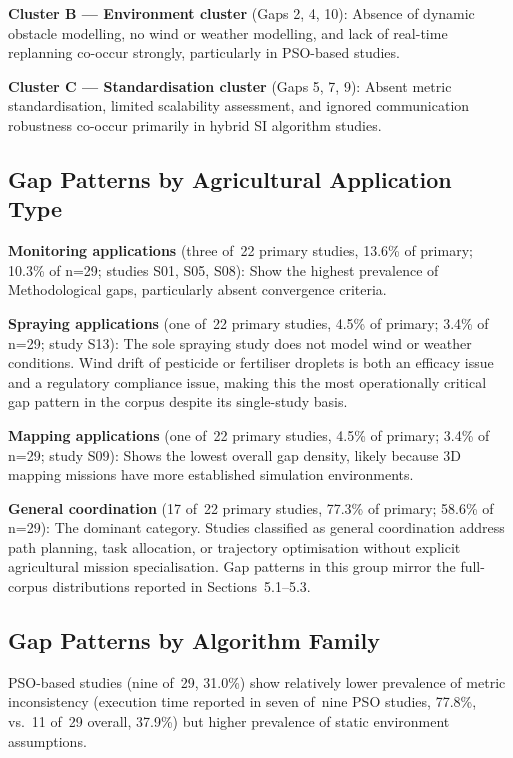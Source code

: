 \documentclass[review,3p]{elsarticle}
\begin{document}
\textbf{Cluster B --- Environment cluster} (Gaps 2, 4, 10): Absence of dynamic
obstacle modelling, no wind or weather modelling, and lack of real-time
replanning co-occur strongly, particularly in PSO-based studies.

\textbf{Cluster C --- Standardisation cluster} (Gaps 5, 7, 9): Absent metric
standardisation, limited scalability assessment, and ignored communication
robustness co-occur primarily in hybrid SI algorithm studies.

\subsection{Gap Patterns by Agricultural Application Type}

\textbf{Monitoring applications} (three of~22 primary studies, 13.6\% of primary;
10.3\% of n=29; studies S01, S05, S08): Show the highest prevalence of Methodological
gaps, particularly absent convergence criteria.

\textbf{Spraying applications} (one of~22 primary studies, 4.5\% of primary;
3.4\% of n=29; study S13): The sole spraying study does not model wind or weather
conditions. Wind drift of pesticide or fertiliser droplets is both an efficacy issue
and a regulatory compliance issue, making this the most operationally critical gap
pattern in the corpus despite its single-study basis.

\textbf{Mapping applications} (one of~22 primary studies, 4.5\% of primary;
3.4\% of n=29; study S09): Shows the lowest overall gap density, likely because
3D mapping missions have more established simulation environments.

\textbf{General coordination} (17 of~22 primary studies, 77.3\% of primary;
58.6\% of n=29): The dominant category. Studies classified as general coordination
address path planning, task allocation, or trajectory optimisation without explicit
agricultural mission specialisation. Gap patterns in this group mirror the
full-corpus distributions reported in Sections~5.1--5.3.

\subsection{Gap Patterns by Algorithm Family}

PSO-based studies (nine of~29, 31.0\%) show relatively lower prevalence of
metric inconsistency (execution time reported in seven of~nine PSO studies,
77.8\%, vs.\ 11 of~29 overall, 37.9\%) but higher prevalence of static
environment assumptions.
\end{document}
